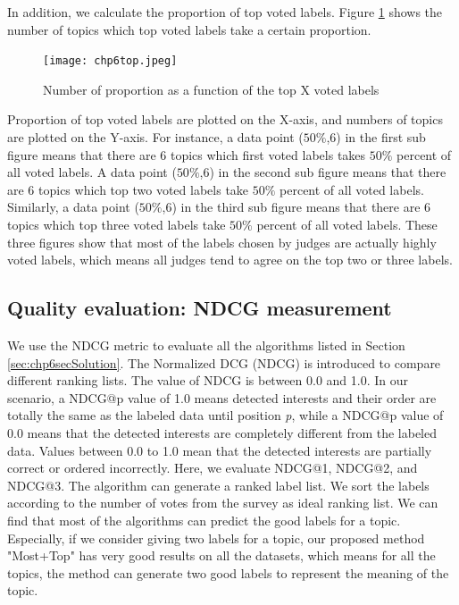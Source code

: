 In addition, we calculate the proportion of top voted labels. Figure \ref{fig:chp6top} shows the number of topics which top voted labels take a certain proportion.
\begin{figure}[htp]
\centering
\texttt{[image: chp6top.jpeg]}  
\caption{Number of proportion as a function of the top X voted labels}
\label{fig:chp6top} 
\end{figure}
Proportion of top voted labels are plotted on the X-axis, and numbers of topics are plotted on the Y-axis. For instance, a data point ($50\%$,6) in the first sub figure means that there are 6 topics which first voted labels takes $50\%$ percent of all voted labels. A data point ($50\%$,6) in the second sub figure means that there are 6 topics which top two voted labels take $50\%$ percent of all voted labels. Similarly, a data point ($50\%$,6) in the third sub figure means that there are 6 topics which top three voted labels take $50\%$ percent of all voted labels. These three figures show that most of the labels chosen by judges are actually highly voted labels, which means all judges tend to agree on the top two or three labels.




\subsection{Quality evaluation: NDCG measurement}
We use the NDCG metric to evaluate all the algorithms listed in Section \ref{sec:chp6secSolution}. The Normalized DCG (NDCG) is introduced to compare different ranking lists. The value of NDCG is between 0.0 and 1.0. In our scenario, a NDCG@p value of 1.0 means detected interests and their order are totally the same as the labeled data until position \textit{p}, while a NDCG@p value of 0.0 means that the detected interests are completely different from the labeled data. Values between 0.0 to 1.0 mean that the detected interests are partially correct or ordered incorrectly. 
Here, we evaluate NDCG@1, NDCG@2, and NDCG@3. The algorithm can generate a ranked label list. We sort the labels according to the number of votes from the survey as ideal ranking list. 
We can find that most of the algorithms can predict the good labels for a topic. Especially, if we consider giving two labels for a topic, our proposed method "Most+Top" has very good results on all the datasets, which means for all the topics, the method can generate two good labels to represent the meaning of the topic.



